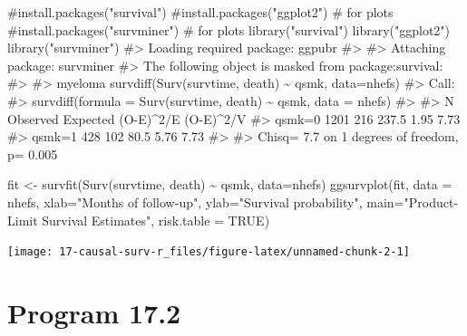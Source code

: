 \documentclass[
  10pt,
  a4paper,
]{book}
\newenvironment{Shaded}{\begin{snugshade}}{\end{snugshade}}
\newcommand{\AttributeTok}[1]{\textcolor[rgb]{0.40,0.45,0.13}{#1}}
\newcommand{\CommentTok}[1]{\textcolor[rgb]{0.37,0.37,0.37}{#1}}
\newcommand{\ConstantTok}[1]{\textcolor[rgb]{0.56,0.35,0.01}{#1}}
\newcommand{\FunctionTok}[1]{\textcolor[rgb]{0.28,0.35,0.67}{#1}}
\newcommand{\NormalTok}[1]{\textcolor[rgb]{0.00,0.46,0.62}{#1}}
\newcommand{\OtherTok}[1]{\textcolor[rgb]{0.00,0.46,0.62}{#1}}
\newcommand{\SpecialCharTok}[1]{\textcolor[rgb]{0.37,0.37,0.37}{#1}}
\newcommand{\StringTok}[1]{\textcolor[rgb]{0.13,0.47,0.30}{#1}}
\begin{document}
\begin{Shaded}
\begin{Highlighting}[]
\CommentTok{\#install.packages("survival")}
\CommentTok{\#install.packages("ggplot2") \# for plots}
\CommentTok{\#install.packages("survminer") \# for plots}
\FunctionTok{library}\NormalTok{(}\StringTok{"survival"}\NormalTok{)}
\FunctionTok{library}\NormalTok{(}\StringTok{"ggplot2"}\NormalTok{)}
\FunctionTok{library}\NormalTok{(}\StringTok{"survminer"}\NormalTok{)}
\CommentTok{\#\textgreater{} Loading required package: ggpubr}
\CommentTok{\#\textgreater{} }
\CommentTok{\#\textgreater{} Attaching package: \textquotesingle{}survminer\textquotesingle{}}
\CommentTok{\#\textgreater{} The following object is masked from \textquotesingle{}package:survival\textquotesingle{}:}
\CommentTok{\#\textgreater{} }
\CommentTok{\#\textgreater{}     myeloma}
\FunctionTok{survdiff}\NormalTok{(}\FunctionTok{Surv}\NormalTok{(survtime, death) }\SpecialCharTok{\textasciitilde{}}\NormalTok{ qsmk, }\AttributeTok{data=}\NormalTok{nhefs)}
\CommentTok{\#\textgreater{} Call:}
\CommentTok{\#\textgreater{} survdiff(formula = Surv(survtime, death) \textasciitilde{} qsmk, data = nhefs)}
\CommentTok{\#\textgreater{} }
\CommentTok{\#\textgreater{}           N Observed Expected (O{-}E)\^{}2/E (O{-}E)\^{}2/V}
\CommentTok{\#\textgreater{} qsmk=0 1201      216    237.5      1.95      7.73}
\CommentTok{\#\textgreater{} qsmk=1  428      102     80.5      5.76      7.73}
\CommentTok{\#\textgreater{} }
\CommentTok{\#\textgreater{}  Chisq= 7.7  on 1 degrees of freedom, p= 0.005}

\NormalTok{fit }\OtherTok{\textless{}{-}} \FunctionTok{survfit}\NormalTok{(}\FunctionTok{Surv}\NormalTok{(survtime, death) }\SpecialCharTok{\textasciitilde{}}\NormalTok{ qsmk, }\AttributeTok{data=}\NormalTok{nhefs)}
\FunctionTok{ggsurvplot}\NormalTok{(fit, }\AttributeTok{data =}\NormalTok{ nhefs, }\AttributeTok{xlab=}\StringTok{"Months of follow{-}up"}\NormalTok{,}
           \AttributeTok{ylab=}\StringTok{"Survival probability"}\NormalTok{,}
           \AttributeTok{main=}\StringTok{"Product{-}Limit Survival Estimates"}\NormalTok{, }\AttributeTok{risk.table =} \ConstantTok{TRUE}\NormalTok{)}
\end{Highlighting}
\end{Shaded}

\begin{center}\texttt{[image: 17-causal-surv-r\_files/figure-latex/unnamed-chunk-2-1]} \end{center}

\section{Program 17.2}\label{program-17.2}
\end{document}
